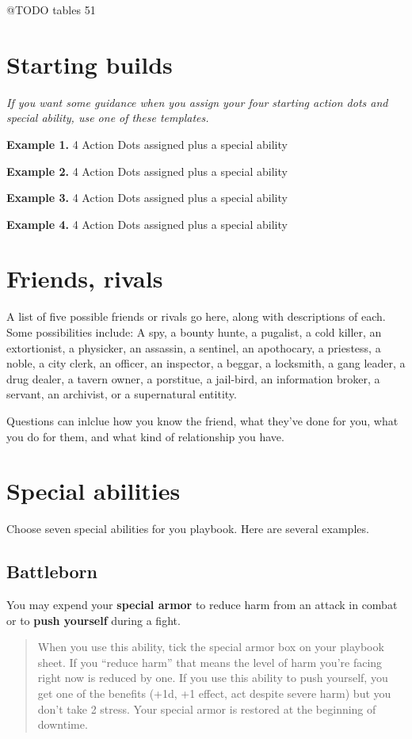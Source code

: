 \documentclass[11pt,oneside]{book}
\begin{document}
@TODO tables 51


\section{Starting builds}

\emph{If you want some guidance when you assign your four starting action dots and special ability, use one of these templates.}

\textbf{Example 1.} 4 Action Dots assigned plus a special ability

\textbf{Example 2.} 4 Action Dots assigned plus a special ability

\textbf{Example 3.} 4 Action Dots assigned plus a special ability

\textbf{Example 4.} 4 Action Dots assigned plus a special ability

\section{Friends, rivals}

A list of five possible friends or rivals go here, along with descriptions of each. Some possibilities include: A spy, a bounty hunte, a pugalist, a cold killer, an extortionist, a physicker, an assassin, a sentinel, an apothocary, a priestess, a noble, a city clerk, an officer, an inspector, a beggar, a locksmith, a gang leader, a drug dealer, a tavern owner, a porstitue, a jail-bird, an information broker, a servant, an archivist, or a supernatural entitity.

Questions can inlclue how you know the friend, what they’ve done for you,  what you do for them, and what kind of relationship you have.

\section{Special abilities}

Choose seven special abilities for you playbook. Here are several examples.

\subsection{Battleborn}

You may expend your \textbf{special armor} to reduce harm from an attack in combat or to \textbf{push yourself} during a fight.

\begin{quote}
	When you use this ability, tick the special armor box on your playbook sheet. If you “reduce harm” that means the level of harm you’re facing right now is reduced by one. If you use this ability to push yourself, you get one of the benefits (+1d, +1 effect, act despite severe harm) but you don’t take 2 stress. Your special armor is restored at the beginning of downtime.
\end{quote}
\end{document}
